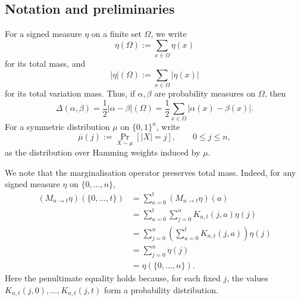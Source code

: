 \documentclass[manuscript,nonacm]{acmart}
\begin{document}
\subsection{Notation and preliminaries}
For a signed measure \(\eta\) on a finite set \(\Omega\), we write
\[
    \eta(\Omega)
    :=
    \sum_{x\in\Omega}\eta(x)
\]
for its total mass, and
\[
    |\eta|(\Omega)
    :=
    \sum_{x\in\Omega}|\eta(x)|
\]
for its total variation mass. Thus, if \(\alpha,\beta\) are probability
measures on \(\Omega\), then
\[
    \Delta(\alpha,\beta)
    =
    \frac12|\alpha-\beta|(\Omega)
    =
    \frac12\sum_{x\in\Omega}|\alpha(x)-\beta(x)|.
\]
For a symmetric distribution \(\mu\) on \(\{0,1\}^n\), write
\[
    \overline{\mu}(j)
    :=
    \Pr_{X\sim\mu}[|X|=j],
    \qquad 0\le j\le n,
\]
as the distribution over Hamming weights induced by $\mu$.

We note that the marginalisation operator preserves total mass. Indeed, for any
signed measure \(\eta\) on \(\{0,\dots,n\}\),
\[
\begin{aligned}
    (M_{n\to t}\eta)(\{0,\dots,t\})
    &=
    \sum_{a=0}^t
    (M_{n\to t}\eta)(a)                                      \\
    &=
    \sum_{a=0}^t
    \sum_{j=0}^n
    K_{n,t}(j,a)\eta(j)                                      \\
    &=
    \sum_{j=0}^n
    \left(
        \sum_{a=0}^t K_{n,t}(j,a)
    \right)\eta(j)                                           \\
    &=
    \sum_{j=0}^n \eta(j)                                     \\
    &=
    \eta(\{0,\dots,n\}).
\end{aligned}
\]
Here the penultimate equality holds because, for each fixed
\(j\), the values $K_{n,t}(j,0),\dots,K_{n,t}(j,t)$ form a probability distribution.
\end{document}
